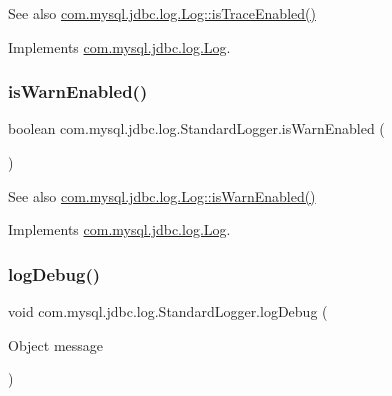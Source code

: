 \begin{DoxySeeAlso}{See also}
\mbox{\hyperlink{interfacecom_1_1mysql_1_1jdbc_1_1log_1_1_log_a821407c0c861bbb9de4618617e2fa519}{com.\+mysql.\+jdbc.\+log.\+Log\+::is\+Trace\+Enabled()}} 
\end{DoxySeeAlso}


Implements \mbox{\hyperlink{interfacecom_1_1mysql_1_1jdbc_1_1log_1_1_log_a821407c0c861bbb9de4618617e2fa519}{com.\+mysql.\+jdbc.\+log.\+Log}}.

\mbox{\label{classcom_1_1mysql_1_1jdbc_1_1log_1_1_standard_logger_ad31d49920ae0271a16aafe7d8d31fc19}} 
\subsubsection{\texorpdfstring{is\+Warn\+Enabled()}{isWarnEnabled()}}
{\footnotesize\ttfamily boolean com.\+mysql.\+jdbc.\+log.\+Standard\+Logger.\+is\+Warn\+Enabled (\begin{DoxyParamCaption}{ }\end{DoxyParamCaption})}

\begin{DoxySeeAlso}{See also}
\mbox{\hyperlink{interfacecom_1_1mysql_1_1jdbc_1_1log_1_1_log_ae786b79391cf28f119aa7b12226b7e2b}{com.\+mysql.\+jdbc.\+log.\+Log\+::is\+Warn\+Enabled()}} 
\end{DoxySeeAlso}


Implements \mbox{\hyperlink{interfacecom_1_1mysql_1_1jdbc_1_1log_1_1_log_ae786b79391cf28f119aa7b12226b7e2b}{com.\+mysql.\+jdbc.\+log.\+Log}}.

\mbox{\label{classcom_1_1mysql_1_1jdbc_1_1log_1_1_standard_logger_a3b3bd15eb1f92d224a747ef52620cfdf}} 
\subsubsection{\texorpdfstring{log\+Debug()}{logDebug()}\hspace{0.1cm}{\footnotesize\ttfamily [1/2]}}
{\footnotesize\ttfamily void com.\+mysql.\+jdbc.\+log.\+Standard\+Logger.\+log\+Debug (\begin{DoxyParamCaption}\item[{Object}]{message }\end{DoxyParamCaption})}

